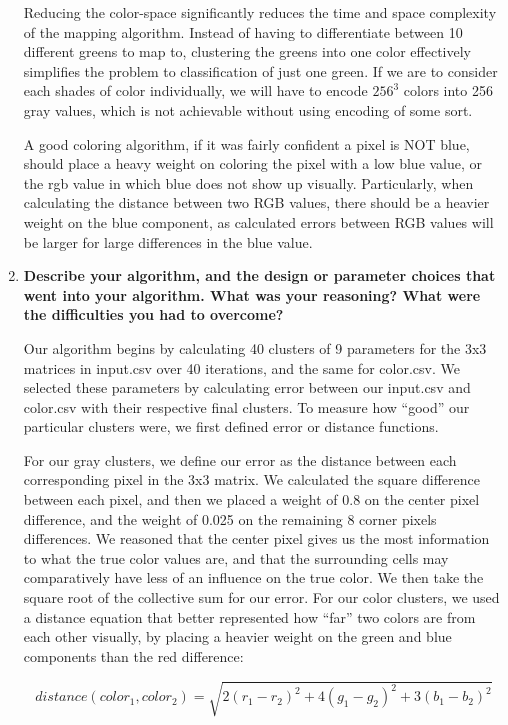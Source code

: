\documentclass[a4paper]{article}
\begin{document}
\begin{enumerate}
Reducing the color-space significantly reduces the time and space complexity of the mapping algorithm. Instead of having to differentiate between 10 different greens to map to, clustering the greens into one color effectively simplifies the problem to classification of just one green. If we are to consider each shades of color individually, we will have to encode $256^3$ colors into 256 gray values, which is not achievable without using encoding of some sort.

A good coloring algorithm, if it was fairly confident a pixel is NOT blue, should place a heavy weight on coloring the pixel with a low blue value, or the rgb value in which blue does not show up visually. Particularly, when calculating the distance between two RGB values, there should be a heavier weight on the blue component, as calculated errors between RGB values will be larger for large differences in the blue value.
\bigskip
\item \textbf{Describe your algorithm, and the design or parameter choices that went into your algorithm. What was your reasoning? What were the difficulties you had to overcome?}

Our algorithm begins by calculating 40 clusters of 9 parameters for the 3x3 matrices in input.csv over 40 iterations, and the same for color.csv. We selected these parameters by calculating error between our input.csv and color.csv with their respective final clusters. To measure how ``good'' our particular clusters were, we first defined error or distance functions.

For our gray clusters, we define our error as the distance between each corresponding pixel in the 3x3 matrix. We calculated the square difference between each pixel, and then we placed a weight of 0.8 on the center pixel difference, and the weight of 0.025 on the remaining 8 corner pixels differences. We reasoned that the center pixel gives us the most information to what the true color values are, and that the surrounding cells may comparatively have less of an influence on the true color. We then take the square root of the collective sum for our error. For our color clusters, we used a distance equation that better represented how ``far'' two colors are from each other visually, by placing a heavier weight on the green and blue components than the red difference:

\begin{equation}
  distance(color_1, color_2) = \sqrt{2(r_1-r_2)^2 + 4(g_1-g_2)^2 + 3(b_1-b_2)^2}
\end{equation}


\end{enumerate}
\end{document}
